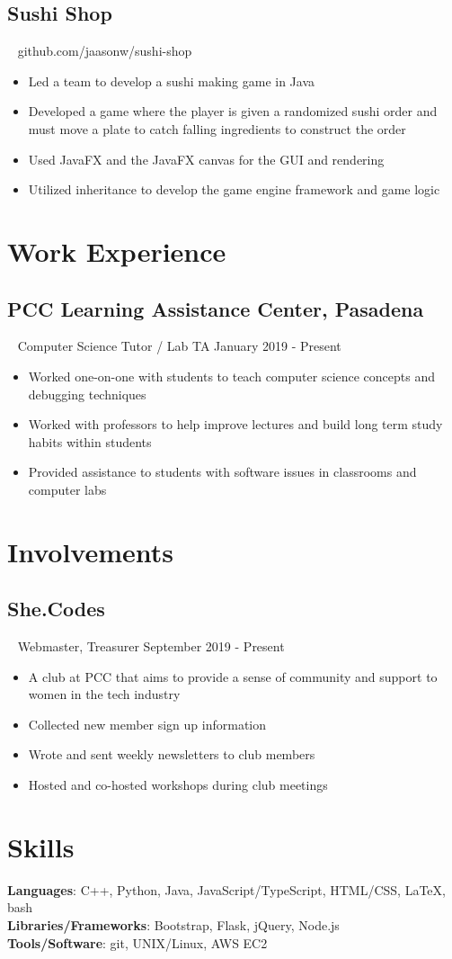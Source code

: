 \documentclass{article}
\newcommand{\resumesection}[3]{
    \subsection*{#1}
    \ 
    \footnotesize
    \textcolor{wordgrey}{#2}
    \normalsize
    \hfill
    \textcolor{wordgrey}{#3}
}
\begin{document}
\resumesection{Sushi Shop}{}{github.com/jaasonw/sushi-shop}
\begin{itemize}
    \item Led a team to develop a sushi making game in Java
    \item Developed a game where the player is given a randomized sushi order and must move a plate to catch falling ingredients to construct the order
    \item Used JavaFX and the JavaFX canvas for the GUI and rendering
    \item Utilized inheritance to develop the game engine framework and game logic
\end{itemize}

\section*{Work Experience}
\resumesection{PCC Learning Assistance Center, Pasadena}{Computer Science Tutor / Lab TA}{January 2019 - Present}
\begin{itemize}
    \item Worked one-on-one with students to teach computer science concepts and debugging techniques
    \item Worked with professors to help improve lectures and build long term study habits within students
    \item Provided assistance to students with software issues in classrooms and computer labs
\end{itemize}

\section*{Involvements}
\resumesection{She.Codes}{Webmaster, Treasurer}{September 2019 - Present}
\begin{itemize}
    \item A club at PCC that aims to provide a sense of community and support to women in the tech industry
    \item Collected new member sign up information
    \item Wrote and sent weekly newsletters to club members
    \item Hosted and co-hosted workshops during club meetings
\end{itemize}

\section*{Skills}
\textbf{Languages}: C++, Python, Java, JavaScript/TypeScript, HTML/CSS, {\selectfont\LaTeX}, bash\\
\textbf{Libraries/Frameworks}: Bootstrap, Flask, jQuery, Node.js\\
\textbf{Tools/Software}: git, UNIX/Linux, AWS EC2
\end{document}
